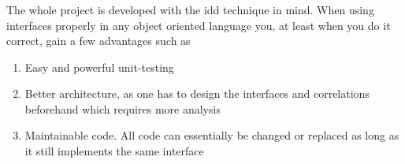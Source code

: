 \documentclass{article}
\begin{document}
\subsubsection{}
The whole project is developed with the \gls{idd} technique\cite{url:considerations:interface-drive-development-1}\cite{url:considerations:interface-drive-development-2} in mind. When using interfaces properly in any object oriented language you, at least when you do it correct, gain a few advantages such as
\begin{enumerate}
    \item Easy and powerful unit-testing
    \item Better architecture, as one has to design the interfaces and correlations beforehand which requires more analysis
    \item Maintainable code. All code can essentially be changed or replaced as long as it still implements the same interface
\end{enumerate}
\end{document}
